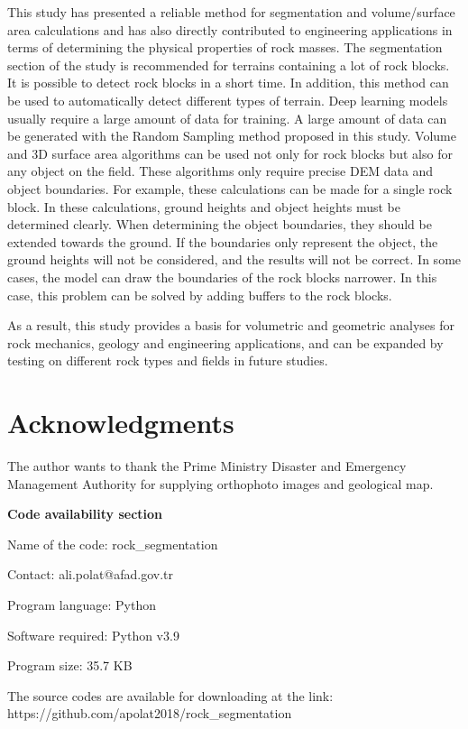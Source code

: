 \documentclass[a4paper,fleqn]{cas-sc}
\begin{document}
This study has presented a reliable method for segmentation and volume/surface area calculations and has also directly contributed to engineering applications in terms of determining the physical properties of rock masses. The segmentation section of the study is recommended for terrains containing a lot of rock blocks. It is possible to detect rock blocks in a short time. In addition, this method can be used to automatically detect different types of terrain. Deep learning models usually require a large amount of data for training. A large amount of data can be generated with the Random Sampling method proposed in this study. Volume and 3D surface area algorithms can be used not only for rock blocks but also for any object on the field. These algorithms only require precise DEM data and object boundaries. For example, these calculations can be made for a single rock block. In these calculations, ground heights and object heights must be determined clearly. When determining the object boundaries, they should be extended towards the ground. If the boundaries only represent the object, the ground heights will not be considered, and the results will not be correct. In some cases, the model can draw the boundaries of the rock blocks narrower. In this case, this problem can be solved by adding buffers to the rock blocks.

As a result, this study provides a basis for volumetric and geometric analyses for rock mechanics, geology and engineering applications, and can be expanded by testing on different rock types and fields in future studies.


\section{Acknowledgments}

The author wants to thank the Prime Ministry Disaster and Emergency Management Authority for supplying orthophoto images and geological map.

\newpage

\textbf{Code availability section}

Name of the code: rock\_segmentation

Contact: ali.polat@afad.gov.tr

Program language: Python
 
Software required: Python v3.9

Program size: 35.7 KB

The source codes are available for downloading at the link:
https://github.com/apolat2018/rock\_segmentation



 
\end{document}

